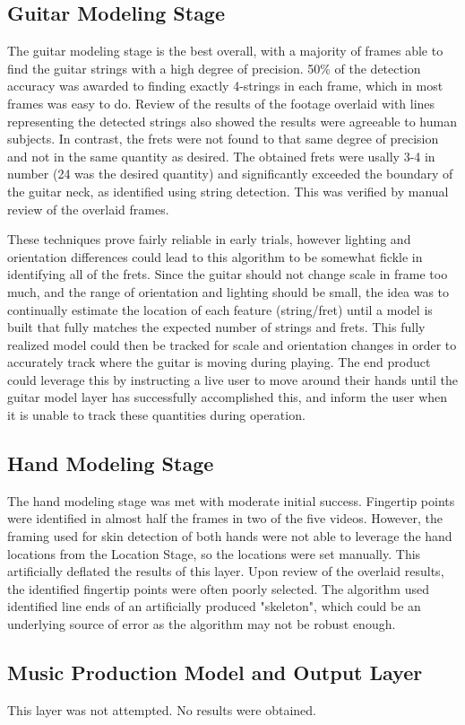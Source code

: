 \subsection{Guitar Modeling Stage}
The guitar modeling stage is the best overall, with a majority of frames able to find the guitar strings
with a high degree of precision. 50\% of the detection accuracy was awarded to finding exactly 4-strings
in each frame, which in most frames was easy to do. Review of the results of the footage overlaid with lines
representing the detected strings also showed the results were agreeable to human subjects.
In contrast, the frets were not found to that same degree of precision and not in the same quantity as desired.
The obtained frets were usally 3-4 in number (24 was the desired quantity) and significantly exceeded the boundary
of the guitar neck, as identified using string detection. This was verified by manual review of the overlaid
frames.
\par%
These techniques prove fairly reliable in early trials, however lighting and orientation
differences could lead to this algorithm to be somewhat fickle in identifying all of the frets.
Since the guitar should not change scale in frame too much, and the range of orientation
and lighting should be small, the idea was to continually estimate the location of each feature
(string/fret) until a model is built that fully matches the expected number of strings and frets.
This fully realized model could then be tracked for scale and orientation changes in order to
accurately track where the guitar is moving during playing.
The end product could leverage this by instructing a live user to move around their hands until
the guitar model layer has successfully accomplished this, and inform the user when it is unable
to track these quantities during operation.

\subsection{Hand Modeling Stage}
The hand modeling stage was met with moderate initial success. Fingertip points were identified in almost
half the frames in two of the five videos. However, the framing used for skin detection of both hands
were not able to leverage the hand locations from the Location Stage, so the locations were set manually.
This artificially deflated the results of this layer. Upon review of the overlaid results, the identified
fingertip points were often poorly selected. The algorithm used identified line ends of an artificially
produced "skeleton", which could be an underlying source of error as the algorithm may not be robust enough.

\subsection{Music Production Model and Output Layer}
This layer was not attempted. No results were obtained.
